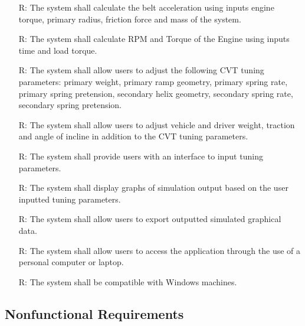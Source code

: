 \documentclass[12pt]{article}
\newcounter{reqnum} %
\begin{document}
\begin{itemize}
\item[R\refstepcounter{reqnum}\thereqnum \label{R_8}:] The system shall calculate the belt acceleration using inputs engine torque, primary radius, friction force and mass of the system. 

\item[R\refstepcounter{reqnum}\thereqnum \label{R_9}:] The system shall calculate RPM and Torque of the Engine using inputs time and load torque.

\item[R\refstepcounter{reqnum}\thereqnum \label{R_10}:] The system shall allow users to adjust the following CVT tuning parameters: primary weight, primary ramp geometry, primary spring rate, primary spring pretension, secondary helix geometry, secondary spring rate, secondary spring pretension. 

\item[R\refstepcounter{reqnum}\thereqnum \label{R_11}:] The system shall allow users to adjust vehicle and driver weight, traction and angle of incline in addition to the CVT tuning parameters.

\item[R\refstepcounter{reqnum}\thereqnum \label{R_12}:] The system shall provide users with an interface to input tuning parameters.

\item[R\refstepcounter{reqnum}\thereqnum \label{R_13}:] The system shall display graphs of simulation output based on the user inputted tuning parameters.

\item[R\refstepcounter{reqnum}\thereqnum \label{R_14}:] The system shall allow users to export outputted simulated graphical data.

\item[R\refstepcounter{reqnum}\thereqnum \label{R_15}:] The system shall allow users to access the application through the use of a personal computer or laptop.

\item[R\refstepcounter{reqnum}\thereqnum \label{R_16}:] The system shall be compatible with Windows machines. 
\end{itemize}

\subsection{Nonfunctional Requirements}
\end{document}
